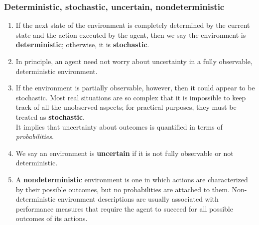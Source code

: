 \subsubsection{Deterministic, stochastic, uncertain, nondeterministic}
\begin{enumerate}
    \item If the next state of the environment is completely determined by the current state and the action executed by the agent, then we say the environment is \textbf{deterministic}; otherwise, it is \textbf{stochastic}.
    \hfill \cite{ai/book/Artificial-Intelligence-A-Modern-Approach/Russell-Norvig}

    \item In principle, an agent need not worry about uncertainty in a fully observable, deterministic environment.
    \hfill \cite{ai/book/Artificial-Intelligence-A-Modern-Approach/Russell-Norvig}

    \item  If the environment is partially observable, however, then it could appear to be stochastic. Most real situations are so complex that it is impossible to keep track of all the unobserved aspects; for practical purposes, they must be treated as \textbf{stochastic}.
    \hfill \cite{ai/book/Artificial-Intelligence-A-Modern-Approach/Russell-Norvig}
    \\
    It implies that uncertainty about outcomes is quantified in terms of \textit{probabilities}.
    \hfill \cite{ai/book/Artificial-Intelligence-A-Modern-Approach/Russell-Norvig}

    \item  We say an environment is \textbf{uncertain} if it is not fully observable or not deterministic. 
    \hfill \cite{ai/book/Artificial-Intelligence-A-Modern-Approach/Russell-Norvig}

    \item A \textbf{nondeterministic} environment is one in which actions are characterized by their possible outcomes, but no probabilities are attached to them. Non-deterministic environment descriptions are usually associated with performance measures that require the agent to succeed for all possible outcomes of its actions.
    \hfill \cite{ai/book/Artificial-Intelligence-A-Modern-Approach/Russell-Norvig}    
\end{enumerate}


